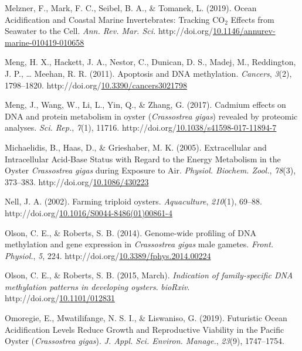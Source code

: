 \documentclass [11pt, proquest] {uwthesis}[2015/03/03]
\newlength{\cslhangindent}
\newenvironment{CSLReferences}%
{\setlength{\parindent}{0pt}%
\everypar{\setlength{\hangindent}{\cslhangindent}}\ignorespaces}%
{\par}
\begin{document}
\begin{CSLReferences}{1}{0}
\leavevmode\hypertarget{ref-Melzner2019}{}%
Melzner, F., Mark, F. C., Seibel, B. A., \& Tomanek, L. (2019). {Ocean Acidification and Coastal Marine Invertebrates: Tracking {CO\(_2\)} Effects from Seawater to the Cell}. \emph{Ann. Rev. Mar. Sci.} http://doi.org/\href{https://doi.org/10.1146/annurev-marine-010419-010658}{10.1146/annurev-marine-010419-010658}

\leavevmode\hypertarget{ref-Meng2011}{}%
Meng, H. X., Hackett, J. A., Nestor, C., Dunican, D. S., Madej, M., Reddington, J. P., \ldots{} Meehan, R. R. (2011). {Apoptosis and DNA methylation}. \emph{Cancers}, \emph{3}(2), 1798--1820. http://doi.org/\href{https://doi.org/10.3390/cancers3021798}{10.3390/cancers3021798}

\leavevmode\hypertarget{ref-Meng2017}{}%
Meng, J., Wang, W., Li, L., Yin, Q., \& Zhang, G. (2017). {Cadmium effects on DNA and protein metabolism in oyster (\emph{Crassostrea gigas}) revealed by proteomic analyses}. \emph{Sci. Rep.}, \emph{7}(1), 11716. http://doi.org/\href{https://doi.org/10.1038/s41598-017-11894-7}{10.1038/s41598-017-11894-7}

\leavevmode\hypertarget{ref-Michaelidis2005}{}%
Michaelidis, B., Haas, D., \& Grieshaber, M. K. (2005). {Extracellular and Intracellular Acid‐Base Status with Regard to the Energy Metabolism in the Oyster \emph{Crassostrea gigas} during Exposure to Air}. \emph{Physiol. Biochem. Zool.}, \emph{78}(3), 373--383. http://doi.org/\href{https://doi.org/10.1086/430223}{10.1086/430223}

\leavevmode\hypertarget{ref-Nell2002}{}%
Nell, J. A. (2002). {Farming triploid oysters}. \emph{Aquaculture}, \emph{210}(1), 69--88. http://doi.org/\href{https://doi.org/10.1016/S0044-8486(01)00861-4}{10.1016/S0044-8486(01)00861-4}

\leavevmode\hypertarget{ref-Olson2014}{}%
Olson, C. E., \& Roberts, S. B. (2014). {Genome-wide profiling of DNA methylation and gene expression in \emph{Crassostrea gigas} male gametes}. \emph{Front. Physiol.}, \emph{5}, 224. http://doi.org/\href{https://doi.org/10.3389/fphys.2014.00224}{10.3389/fphys.2014.00224}

\leavevmode\hypertarget{ref-Olson2015}{}%
Olson, C. E., \& Roberts, S. B. (2015, March). \emph{{Indication of family-specific DNA methylation patterns in developing oysters}}. \emph{bioRxiv}. http://doi.org/\href{https://doi.org/10.1101/012831}{10.1101/012831}

\leavevmode\hypertarget{ref-Omoregie2019}{}%
Omoregie, E., Mwatilifange, N. S. I., \& Liswaniso, G. (2019). {Futuristic Ocean Acidification Levels Reduce Growth and Reproductive Viability in the Pacific Oyster (\emph{Crassostrea gigas})}. \emph{J. Appl. Sci. Environ. Manage.}, \emph{23}(9), 1747--1754.


\end{CSLReferences}
\end{document}
